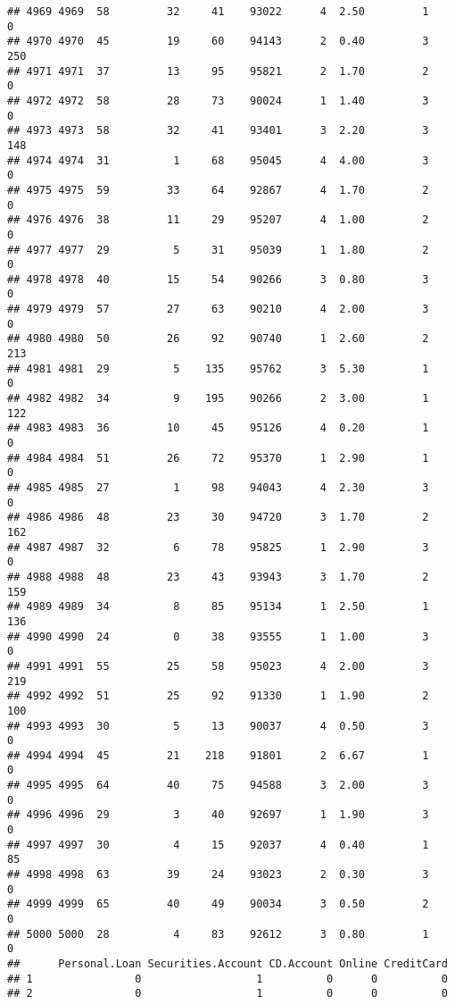 \documentclass[
]{article}
\begin{document}
\begin{verbatim}
## 4969 4969  58         32     41    93022      4  2.50         1        0
## 4970 4970  45         19     60    94143      2  0.40         3      250
## 4971 4971  37         13     95    95821      2  1.70         2        0
## 4972 4972  58         28     73    90024      1  1.40         3        0
## 4973 4973  58         32     41    93401      3  2.20         3      148
## 4974 4974  31          1     68    95045      4  4.00         3        0
## 4975 4975  59         33     64    92867      4  1.70         2        0
## 4976 4976  38         11     29    95207      4  1.00         2        0
## 4977 4977  29          5     31    95039      1  1.80         2        0
## 4978 4978  40         15     54    90266      3  0.80         3        0
## 4979 4979  57         27     63    90210      4  2.00         3        0
## 4980 4980  50         26     92    90740      1  2.60         2      213
## 4981 4981  29          5    135    95762      3  5.30         1        0
## 4982 4982  34          9    195    90266      2  3.00         1      122
## 4983 4983  36         10     45    95126      4  0.20         1        0
## 4984 4984  51         26     72    95370      1  2.90         1        0
## 4985 4985  27          1     98    94043      4  2.30         3        0
## 4986 4986  48         23     30    94720      3  1.70         2      162
## 4987 4987  32          6     78    95825      1  2.90         3        0
## 4988 4988  48         23     43    93943      3  1.70         2      159
## 4989 4989  34          8     85    95134      1  2.50         1      136
## 4990 4990  24          0     38    93555      1  1.00         3        0
## 4991 4991  55         25     58    95023      4  2.00         3      219
## 4992 4992  51         25     92    91330      1  1.90         2      100
## 4993 4993  30          5     13    90037      4  0.50         3        0
## 4994 4994  45         21    218    91801      2  6.67         1        0
## 4995 4995  64         40     75    94588      3  2.00         3        0
## 4996 4996  29          3     40    92697      1  1.90         3        0
## 4997 4997  30          4     15    92037      4  0.40         1       85
## 4998 4998  63         39     24    93023      2  0.30         3        0
## 4999 4999  65         40     49    90034      3  0.50         2        0
## 5000 5000  28          4     83    92612      3  0.80         1        0
##      Personal.Loan Securities.Account CD.Account Online CreditCard
## 1                0                  1          0      0          0
## 2                0                  1          0      0          0

\end{verbatim}
\end{document}
